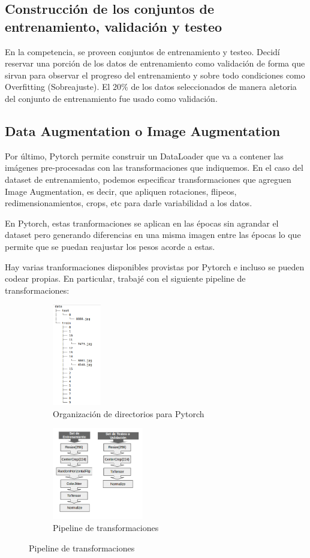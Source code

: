 \documentclass{article}[9pt]
\begin{document}
\subsection{Construcción de los conjuntos de entrenamiento, validación y testeo}

En la competencia, se proveen conjuntos de entrenamiento y testeo. Decidí reservar una porción de los datos de entrenamiento como validación de forma que sirvan para observar el progreso del entrenamiento y sobre todo condiciones como Overfitting (Sobreajuste). El 20\% de los datos seleccionados de manera aletoria del conjunto de entrenamiento fue usado como validación.

\subsection{Data Augmentation o Image Augmentation}

Por último, Pytorch permite construir un DataLoader que va a contener las imágenes pre-procesadas con las transformaciones que indiquemos. En el caso del dataset de entrenamiento, podemos especificar transformaciones que agreguen Image Augmentation, es decir, que apliquen rotaciones, flipeos, redimensionamientos, crops, etc para darle variabilidad a los datos. 

En Pytorch, estas tranformaciones se aplican en las épocas sin agrandar el dataset pero generando diferencias en una misma imagen entre las épocas lo que permite que se puedan reajustar los pesos acorde a estas. 

Hay varias tranformaciones disponibles provistas por Pytorch e incluso se pueden codear propias. En particular, trabajé con el siguiente pipeline de transformaciones:

\begin{figure}[H]
 \begin{subfigure}{.4\textwidth}
  \centering
    \includegraphics[width=80px]{img/directories.png}
    \caption{Organización de directorios para Pytorch}
    \label{directories}
  \end{subfigure}
 \begin{subfigure}{.6\textwidth}
   \centering
    \includegraphics[width=150px]{img/transformaciones.png}
    \caption{ Pipeline de transformaciones  }
  \end{subfigure}
\end{figure}
\end{document}
